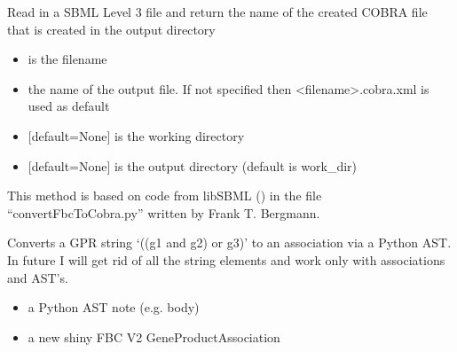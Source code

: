 \documentclass[letterpaper,10pt,english]{sphinxmanual}
\begin{document}
\begin{fulllineitems}
\label{\detokenize{modules_doc:cbmpy.CBXML.sbml_convertSBML3FBCToCOBRA}}
\pysigstartsignatures
{}
\pysigstopsignatures
\sphinxAtStartPar
Read in a SBML Level 3 file and return the name of the created COBRA
file that is created in the output directory
\begin{itemize}
\item {} 
\sphinxAtStartPar
{} is the filename

\item {} 
\sphinxAtStartPar
{} the name of the output file. If not specified then \textless{}filename\textgreater{}.cobra.xml is used as default

\item {} 
\sphinxAtStartPar
{} {[}default=None{]} is the working directory

\item {} 
\sphinxAtStartPar
{} {[}default=None{]} is the output directory (default is work\_dir)

\end{itemize}

\sphinxAtStartPar
This method is based on code from libSBML () in the file “convertFbcToCobra.py”
written by Frank T. Bergmann.

\end{fulllineitems}


\begin{fulllineitems}
\label{\detokenize{modules_doc:cbmpy.CBXML.sbml_createAssociationFromAST}}
\pysigstartsignatures
{}
\pysigstopsignatures
\sphinxAtStartPar
Converts a GPR string ‘((g1 and g2) or g3)’ to an association via a Python AST.
In future I will get rid of all the string elements and work only with associations
and AST’s.
\begin{itemize}
\item {} 
\sphinxAtStartPar
{} a Python AST note (e.g. body)

\item {} 
\sphinxAtStartPar
{} a new shiny FBC V2 GeneProductAssociation

\end{itemize}

\end{fulllineitems}
\end{document}
